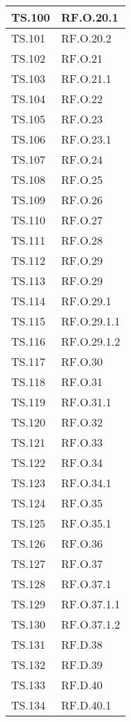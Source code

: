 {{{{{{{{{\begin{tabularx}{\textwidth}{p{}|X}
    \hline
    TS.100 & RF.O.20.1 \\
    \hline
    TS.101 & RF.O.20.2 \\
    \hline
    TS.102 & RF.O.21 \\
    \hline
    TS.103 & RF.O.21.1 \\
    \hline
    TS.104 & RF.O.22 \\
    \hline
    TS.105 & RF.O.23 \\
    \hline
    TS.106 & RF.O.23.1 \\
    \hline
    TS.107 & RF.O.24 \\
    \hline
    TS.108 & RF.O.25 \\
    \hline
    TS.109 & RF.O.26 \\
    \hline
    TS.110 & RF.O.27 \\
    \hline
    TS.111 & RF.O.28 \\
    \hline
    TS.112 & RF.O.29 \\
    \hline
        TS.113 & RF.O.29 \\
    \hline
    TS.114 & RF.O.29.1 \\
    \hline
    TS.115 & RF.O.29.1.1 \\
    \hline
    TS.116 & RF.O.29.1.2 \\
    \hline
    TS.117 & RF.O.30 \\
    \hline
    TS.118 & RF.O.31 \\
    \hline
    TS.119 & RF.O.31.1 \\
    \hline
    TS.120 & RF.O.32 \\
    \hline
    TS.121 & RF.O.33 \\
    \hline
    TS.122 & RF.O.34 \\
    \hline
    TS.123 & RF.O.34.1 \\
    \hline
    TS.124 & RF.O.35 \\
    \hline
    TS.125 & RF.O.35.1 \\
    \hline
    TS.126 & RF.O.36 \\
    \hline
    TS.127 & RF.O.37 \\
    \hline
    TS.128 & RF.O.37.1 \\
    \hline
    TS.129 & RF.O.37.1.1 \\
    \hline
    TS.130 & RF.O.37.1.2 \\
    \hline
    TS.131 & RF.D.38 \\
    \hline
    TS.132 & RF.D.39 \\
    \hline
    TS.133 & RF.D.40 \\
    \hline
    TS.134 & RF.D.40.1 \\

\end{tabularx}}}}}}}}}}
